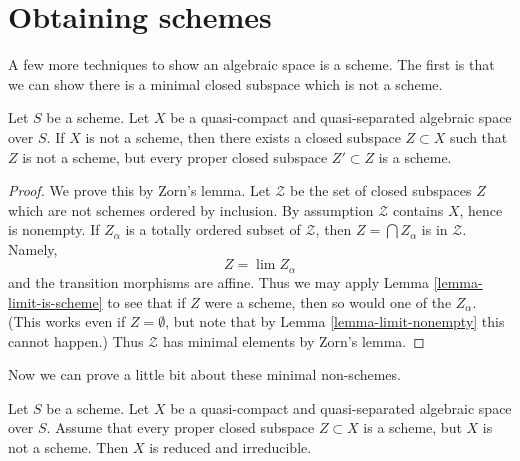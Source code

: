 \section{Obtaining schemes}
\label{section-representable}

\noindent
A few more techniques to show an algebraic space is a scheme.
The first is that we can show there is a minimal closed subspace
which is not a scheme.

\begin{lemma}
\label{lemma-minimal-closed-subspace}
Let $S$ be a scheme. Let $X$ be a quasi-compact and quasi-separated
algebraic space over $S$. If $X$ is not a scheme, then there exists
a closed subspace $Z \subset X$ such that $Z$ is not a scheme, but
every proper closed subspace $Z' \subset Z$ is a scheme.
\end{lemma}

\begin{proof}
We prove this by Zorn's lemma. Let $\mathcal{Z}$ be the set
of closed subspaces $Z$ which are not schemes ordered by inclusion.
By assumption $\mathcal{Z}$ contains $X$, hence is nonempty.
If $Z_\alpha$ is a totally ordered subset of $\mathcal{Z}$, then
$Z = \bigcap Z_\alpha$ is in $\mathcal{Z}$. Namely,
$$
Z = \lim Z_\alpha
$$
and the transition morphisms are affine.
Thus we may apply Lemma \ref{lemma-limit-is-scheme} to see that if $Z$
were a scheme, then so would one of the $Z_\alpha$.
(This works even if $Z = \emptyset$, but note that by
Lemma \ref{lemma-limit-nonempty} this cannot happen.)
Thus $\mathcal{Z}$ has minimal elements by Zorn's lemma.
\end{proof}

\noindent
Now we can prove a little bit about these minimal non-schemes.

\begin{lemma}
\label{lemma-minimal-nonscheme}
Let $S$ be a scheme. Let $X$ be a quasi-compact and quasi-separated
algebraic space over $S$. Assume that every proper closed subspace
$Z \subset X$ is a scheme, but $X$ is not a scheme. Then $X$ is reduced
and irreducible.
\end{lemma}

